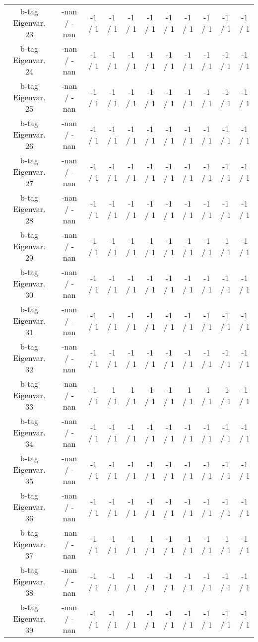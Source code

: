 \begin{table}[htbp]
\begin{center}
\begin{tabular}{|c|c|c|c|c|c|c|c|c|c|c|}
  b-tag Eigenvar. 23 & -nan / -nan & -1 / 1 & -1 / 1 & -1 / 1 & -1 / 1 & -1 / 1 & -1 / 1 & -1 / 1 & -1 / 1 & -1 / 1 \\ 
  b-tag Eigenvar. 24 & -nan / -nan & -1 / 1 & -1 / 1 & -1 / 1 & -1 / 1 & -1 / 1 & -1 / 1 & -1 / 1 & -1 / 1 & -1 / 1 \\ 
  b-tag Eigenvar. 25 & -nan / -nan & -1 / 1 & -1 / 1 & -1 / 1 & -1 / 1 & -1 / 1 & -1 / 1 & -1 / 1 & -1 / 1 & -1 / 1 \\ 
  b-tag Eigenvar. 26 & -nan / -nan & -1 / 1 & -1 / 1 & -1 / 1 & -1 / 1 & -1 / 1 & -1 / 1 & -1 / 1 & -1 / 1 & -1 / 1 \\ 
  b-tag Eigenvar. 27 & -nan / -nan & -1 / 1 & -1 / 1 & -1 / 1 & -1 / 1 & -1 / 1 & -1 / 1 & -1 / 1 & -1 / 1 & -1 / 1 \\ 
  b-tag Eigenvar. 28 & -nan / -nan & -1 / 1 & -1 / 1 & -1 / 1 & -1 / 1 & -1 / 1 & -1 / 1 & -1 / 1 & -1 / 1 & -1 / 1 \\ 
  b-tag Eigenvar. 29 & -nan / -nan & -1 / 1 & -1 / 1 & -1 / 1 & -1 / 1 & -1 / 1 & -1 / 1 & -1 / 1 & -1 / 1 & -1 / 1 \\ 
  b-tag Eigenvar. 30 & -nan / -nan & -1 / 1 & -1 / 1 & -1 / 1 & -1 / 1 & -1 / 1 & -1 / 1 & -1 / 1 & -1 / 1 & -1 / 1 \\ 
  b-tag Eigenvar. 31 & -nan / -nan & -1 / 1 & -1 / 1 & -1 / 1 & -1 / 1 & -1 / 1 & -1 / 1 & -1 / 1 & -1 / 1 & -1 / 1 \\ 
  b-tag Eigenvar. 32 & -nan / -nan & -1 / 1 & -1 / 1 & -1 / 1 & -1 / 1 & -1 / 1 & -1 / 1 & -1 / 1 & -1 / 1 & -1 / 1 \\ 
  b-tag Eigenvar. 33 & -nan / -nan & -1 / 1 & -1 / 1 & -1 / 1 & -1 / 1 & -1 / 1 & -1 / 1 & -1 / 1 & -1 / 1 & -1 / 1 \\ 
  b-tag Eigenvar. 34 & -nan / -nan & -1 / 1 & -1 / 1 & -1 / 1 & -1 / 1 & -1 / 1 & -1 / 1 & -1 / 1 & -1 / 1 & -1 / 1 \\ 
  b-tag Eigenvar. 35 & -nan / -nan & -1 / 1 & -1 / 1 & -1 / 1 & -1 / 1 & -1 / 1 & -1 / 1 & -1 / 1 & -1 / 1 & -1 / 1 \\ 
  b-tag Eigenvar. 36 & -nan / -nan & -1 / 1 & -1 / 1 & -1 / 1 & -1 / 1 & -1 / 1 & -1 / 1 & -1 / 1 & -1 / 1 & -1 / 1 \\ 
  b-tag Eigenvar. 37 & -nan / -nan & -1 / 1 & -1 / 1 & -1 / 1 & -1 / 1 & -1 / 1 & -1 / 1 & -1 / 1 & -1 / 1 & -1 / 1 \\ 
  b-tag Eigenvar. 38 & -nan / -nan & -1 / 1 & -1 / 1 & -1 / 1 & -1 / 1 & -1 / 1 & -1 / 1 & -1 / 1 & -1 / 1 & -1 / 1 \\ 
  b-tag Eigenvar. 39 & -nan / -nan & -1 / 1 & -1 / 1 & -1 / 1 & -1 / 1 & -1 / 1 & -1 / 1 & -1 / 1 & -1 / 1 & -1 / 1 \\ 

\end{tabular}
\end{center}
\end{table}
